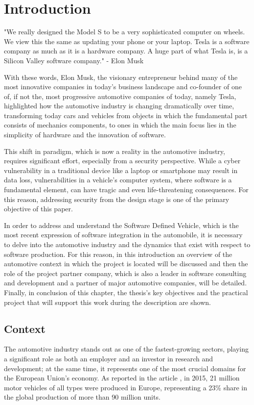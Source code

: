 \hypersetup{
    colorlinks=true,
    linkcolor=blue
}

\chapter{Introduction} \label{ch:introduction}
\begin{center}
  "We really designed the Model S to be a very sophisticated computer on wheels. We view this the same as updating your phone or your laptop. Tesla is a software company as much as it is a hardware company. A huge part of what Tesla is, is a Silicon Valley software company."
  - Elon Musk \cite{ElonMusk}
\end{center}
With these words, Elon Musk, the visionary entrepreneur behind many of the most innovative companies in today's business landscape and co-founder of one of, if not the, most progressive automotive companies of today, namely Tesla, highlighted how the automotive industry is changing dramatically over time, transforming today cars and vehicles from objects in which the fundamental part consists of mechanics components, to ones in which the main focus lies in the simplicity of hardware and the innovation of software.

This shift in paradigm, which is now a reality in the automotive industry, requires significant effort, especially from a security perspective. While a cyber vulnerability in a traditional device like a laptop or smartphone may result in data loss, vulnerabilities in a vehicle's computer system, where software is a fundamental element, can have tragic and even life-threatening consequences. For this reason, addressing security from the design stage is one of the primary objective of this paper.

In order to address and understand the Software Defined Vehicle, which is the most recent expression of software integration in the automobile, it is necessary to delve into the automotive industry and the dynamics that exist with respect to software production. For this reason, in this introduction an overview of the automotive context in which the project is located will be discussed and then the role of the project partner company, which is also a leader in software consulting and development and a partner of major automotive companies, will be detailed. Finally, in conclusion of this chapter, the thesis's key objectives and the practical project that will support this work during the description are shown.
\section{Context}
The automotive industry stands out as one of the fastest-growing sectors, playing a significant role as both an employer and an investor in research and development; at the same time, it represents one of the most crucial domains for the European Union's economy. As reported in the article \cite{automotiveInCentralEurope}, in 2015, 21 million motor vehicles of all types were produced in Europe, representing a 23\% share in the global production of more than 90 million units.

